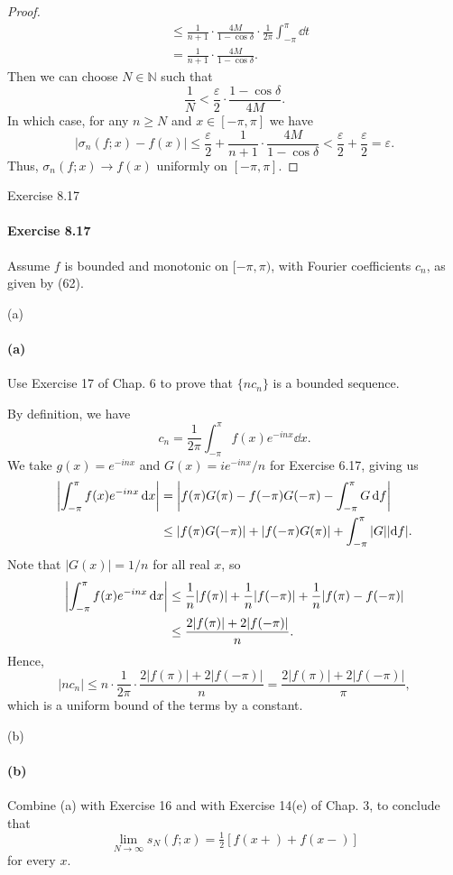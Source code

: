 \documentclass[12pt]{article}
\newenvironment{fullbox}{\begin{lrbox}{\savefullbox}\begin{minipage}{\dimexpr\textwidth-2\fboxsep\relax}}{\end{minipage}\end{lrbox}\begin{center}\framebox[\textwidth]{\usebox{\savefullbox}}\end{center}}
\newenvironment{pbox}[1][]{\begin{fullbox}\ifx#1\empty\else\paragraph{#1}\fi}{\end{fullbox}}
\theoremstyle{definition}
\newcommand{\N}{\mathbb{N}}
\newcommand{\eps}{\varepsilon}
\begin{document}
\begin{proof}
\begin{align*}
            &\leq \frac{1}{n + 1} \cdot \frac{4M}{1-\cos \delta} \cdot \frac{1}{2\pi} \int_{-\pi}^{\pi} \dd{t} \\
            &= \frac{1}{n + 1} \cdot \frac{4M}{1-\cos \delta}.
    \end{align*}
    Then we can choose $N \in \N$ such that
    \[
        \frac{1}{N} < \frac{\eps}{2} \cdot \frac{1 - \cos\delta}{4M}.
    \]
    In which case, for any $n \geq N$ and $x \in [-\pi, \pi]$ we have
    \[
        |\sigma_n(f; x) - f(x)|
            \leq \frac{\eps}{2} + \frac{1}{n + 1} \cdot \frac{4M}{1-\cos \delta}
            < \frac{\eps}{2} + \frac{\eps}{2}
            = \eps.
    \]
    Thus, $\sigma_n(f; x) \to f(x)$ uniformly on $[-\pi, \pi]$.
    
\end{proof}

\newpage
\begin{pbox}[Exercise 8.17]
    Assume $f$ is bounded and monotonic on $[-\pi, \pi)$, with Fourier coefficients $c_n$, as given by (62).
\end{pbox}

\begin{pbox}[(a)]
    Use Exercise 17 of Chap. 6 to prove that $\{nc_n\}$ is a bounded sequence.
\end{pbox}


By definition, we have
\[
    c_n = \frac{1}{2\pi} \int_{-\pi}^{\pi} f(x)e^{-inx} \dd{x}. 
\]
We take $g(x) = e^{-inx}$ and $G(x) = ie^{-inx}/n$ for Exercise 6.17, giving us
\begin{align*}
    \abs{\int_{-\pi}^{\pi} f(x)e^{-inx} \dd{x}}
        &= \abs{f(\pi)G(\pi) - f(-\pi)G(-\pi) - \int_{-\pi}^{\pi} G \dd{f}} \\
        &\leq |f(\pi)G(-\pi)| + |f(-\pi)G(\pi)| + \int_{-\pi}^{\pi} |G| |{\dd{f}}|.
\end{align*}
Note that $|G(x)| = 1/n$ for all real $x$, so
\begin{align*}
    \abs{\int_{-\pi}^{\pi} f(x)e^{-inx} \dd{x}}
        &\leq \frac{1}{n}|f(\pi)| + \frac{1}{n}|f(-\pi)| + \frac{1}{n}|f(\pi) - f(-\pi)| \\
        &\leq \frac{2|f(\pi)| + 2|f(-\pi)|}{n}.
\end{align*}
Hence,
\[
    |nc_n|
        \leq n \cdot \frac{1}{2\pi} \cdot \frac{2|f(\pi)| + 2|f(-\pi)|}{n}
        = \frac{2|f(\pi)| + 2|f(-\pi)|}{\pi},
\]
which is a uniform bound of the terms by a constant.



\begin{pbox}[(b)]
    Combine (a) with Exercise 16 and with Exercise 14(e) of Chap. 3, to conclude that
    \[
        \lim_{N \to \infty} s_N(f; x) = \tfrac12 [f(x+) + f(x-)]
    \]
    for every $x$.
\end{pbox}
\end{document}
